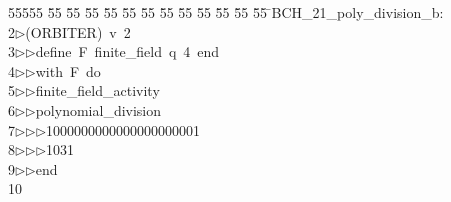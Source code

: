 %
%
\begin{tabbing}
55555 \= 55 \= 55 \= 55 \= 55 \= 55 \= 55 \= 55 \= 55 \= 55 \= 55 \= 55 \= 55 \= \>BCH\_21\_poly\_division\_b:\\[0pt]
2\>$\triangleright$\>(ORBITER)\ v\ 2\ \\[0pt]
3\>$\triangleright$\>$\triangleright$\>define\ F\ finite\_field\ q\ 4\ end\ \\[0pt]
4\>$\triangleright$\>$\triangleright$\>with\ F\ do\ \\[0pt]
5\>$\triangleright$\>$\triangleright$\>finite\_field\_activity\ \\[0pt]
6\>$\triangleright$\>$\triangleright$\>polynomial\_division\ \\[0pt]
7\>$\triangleright$\>$\triangleright$\>$\triangleright$\>1000000000000000000001\ \\[0pt]
8\>$\triangleright$\>$\triangleright$\>$\triangleright$\>1031\ \\[0pt]
9\>$\triangleright$\>$\triangleright$\>end\\[0pt]
10\>\end{tabbing}
